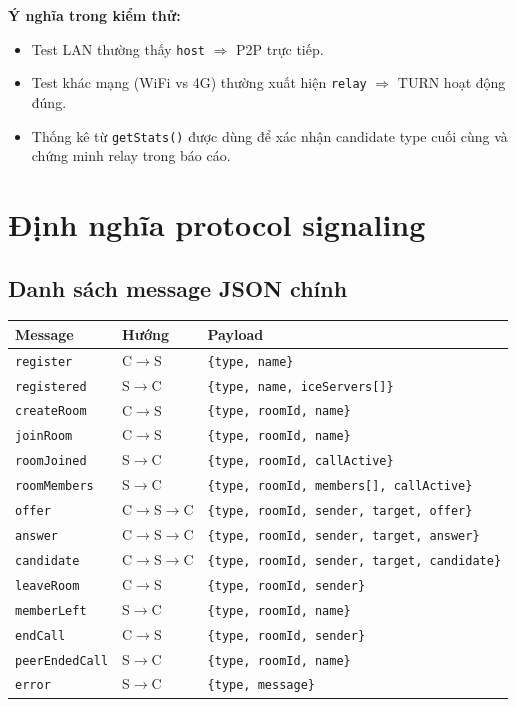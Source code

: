\documentclass[12pt,a4paper]{article}
\begin{document}
\textbf{Ý nghĩa trong kiểm thử:}
\begin{itemize}[leftmargin=1.5em]
  \item Test LAN thường thấy \texttt{host} $\Rightarrow$ P2P trực tiếp.
  \item Test khác mạng (WiFi vs 4G) thường xuất hiện \texttt{relay} $\Rightarrow$ TURN hoạt động đúng.
  \item Thống kê từ \texttt{getStats()} được dùng để xác nhận candidate type cuối cùng và chứng minh relay trong báo cáo.
\end{itemize}

\section{Định nghĩa protocol signaling}

\subsection{Danh sách message JSON chính}
\begin{longtable}{@{}p{3cm}p{2cm}p{8.5cm}@{}}
\toprule
\textbf{Message} & \textbf{Hướng} & \textbf{Payload} \\
\midrule
\endhead
\texttt{register} & C$\rightarrow$S & \texttt{\{type, name\}} \\
\texttt{registered} & S$\rightarrow$C & \texttt{\{type, name, iceServers[]\}} \\
\texttt{createRoom} & C$\rightarrow$S & \texttt{\{type, roomId, name\}} \\
\texttt{joinRoom} & C$\rightarrow$S & \texttt{\{type, roomId, name\}} \\
\texttt{roomJoined} & S$\rightarrow$C & \texttt{\{type, roomId, callActive\}} \\
\texttt{roomMembers} & S$\rightarrow$C & \texttt{\{type, roomId, members[], callActive\}} \\
\texttt{offer} & C$\rightarrow$S$\rightarrow$C & \texttt{\{type, roomId, sender, target, offer\}} \\
\texttt{answer} & C$\rightarrow$S$\rightarrow$C & \texttt{\{type, roomId, sender, target, answer\}} \\
\texttt{candidate} & C$\rightarrow$S$\rightarrow$C & \texttt{\{type, roomId, sender, target, candidate\}} \\
\texttt{leaveRoom} & C$\rightarrow$S & \texttt{\{type, roomId, sender\}} \\
\texttt{memberLeft} & S$\rightarrow$C & \texttt{\{type, roomId, name\}} \\
\texttt{endCall} & C$\rightarrow$S & \texttt{\{type, roomId, sender\}} \\
\texttt{peerEndedCall} & S$\rightarrow$C & \texttt{\{type, roomId, name\}} \\
\texttt{error} & S$\rightarrow$C & \texttt{\{type, message\}} \\
\bottomrule
\end{longtable}
\end{document}
